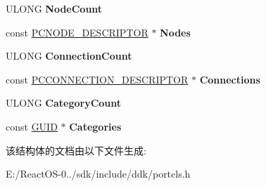 \begin{DoxyCompactItemize}
U\+L\+O\+NG {\bfseries Node\+Count}
\item 
\mbox{\label{struct_p_c_f_i_l_t_e_r___d_e_s_c_r_i_p_t_o_r_a32279578e494efc891754ea5b4731110}} 
const \hyperlink{struct_p_c_n_o_d_e___d_e_s_c_r_i_p_t_o_r}{P\+C\+N\+O\+D\+E\+\_\+\+D\+E\+S\+C\+R\+I\+P\+T\+OR} $\ast$ {\bfseries Nodes}
\item 
\mbox{\label{struct_p_c_f_i_l_t_e_r___d_e_s_c_r_i_p_t_o_r_a08f51cf80785f4d50ce0f84e35f71eb1}} 
U\+L\+O\+NG {\bfseries Connection\+Count}
\item 
\mbox{\label{struct_p_c_f_i_l_t_e_r___d_e_s_c_r_i_p_t_o_r_a6ceee752026d5d27597a30f0f3389358}} 
const \hyperlink{struct_p_c_c_o_n_n_e_c_t_i_o_n___d_e_s_c_r_i_p_t_o_r}{P\+C\+C\+O\+N\+N\+E\+C\+T\+I\+O\+N\+\_\+\+D\+E\+S\+C\+R\+I\+P\+T\+OR} $\ast$ {\bfseries Connections}
\item 
\mbox{\label{struct_p_c_f_i_l_t_e_r___d_e_s_c_r_i_p_t_o_r_a695e33ec9e1343375db3f717e51a68d6}} 
U\+L\+O\+NG {\bfseries Category\+Count}
\item 
\mbox{\label{struct_p_c_f_i_l_t_e_r___d_e_s_c_r_i_p_t_o_r_a3cae5b159a1b04762f4d42c112199e02}} 
const \hyperlink{interface_g_u_i_d}{G\+U\+ID} $\ast$ {\bfseries Categories}
\end{DoxyCompactItemize}


该结构体的文档由以下文件生成\+:\begin{DoxyCompactItemize}
\item 
E\+:/\+React\+O\+S-\/0../sdk/include/ddk/portcls.\+h\end{DoxyCompactItemize}
